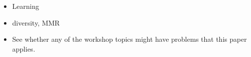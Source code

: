
{\color{red!75}
\begin{itemize}
	\item Learning
	\item diversity, MMR
	\item See whether any of the workshop topics might have problems that this paper applies.
\end{itemize}
}
